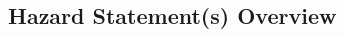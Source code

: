 \documentclass[{{ data.paper }}, 11pt]{article}
\newcommand{\done}{\rlap{\color{MerckTeal}$\square$}\ding{55} }
\begin{document}
\subsection*{Hazard Statement(s) Overview}
\begin{multicols}{3}\raggedright
\begin{checklist}[noitemsep]
\item{%
\item{%
\item{%
\item{%
\item{%
\item{%
\item{%
\item{%
\item{%
\item{%
\item{%
\item{%
\item{%
\item{%
\item{%
\item{%
}}}}}}}}}}}}}}}}
\end{checklist}
\end{multicols}
\end{document}
